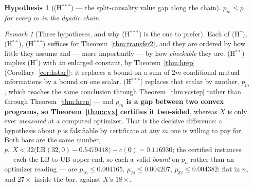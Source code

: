 \documentclass[11pt]{article}
\newtheorem{hypothesis}{Hypothesis}
\theoremstyle{definition}
\theoremstyle{remark}
\newtheorem{remark}{Remark}
\begin{document}
\begin{hypothesis}[(H$^{\ast\ast\ast}$) --- the split-causality value
gap along the chain]
\label{hyp:hstar3}
$p_m\le\bar p$ for every $m$ in the dyadic chain.
\end{hypothesis}

\begin{remark}[Three hypotheses, and why (H$^{\ast\ast\ast}$) is the
one to prefer]
\label{rem:hchain}
Each of (H$^\ast$), (H$^{\ast\ast}$), (H$^{\ast\ast\ast}$) suffices for
Theorem~\ref{thm:transfer2}, and they are ordered by how little they
assume and --- more importantly --- by how \emph{checkable} they are.
(H$^{\ast\ast}$) implies (H$^\ast$) with an enlarged constant, by
Theorem~\ref{thm:hrep} (Corollary~\ref{cor:hstar}); it replaces a bound
on a sum of $2m$ conditional mutual informations by a bound on one
scalar. (H$^{\ast\ast\ast}$) replaces that scalar by another,
$p_m$, which reaches the same conclusion through
Theorem~\ref{thm:scstep} rather than through
Theorem~\ref{thm:hrep} --- and \textbf{$p_m$ is a gap between two
convex programs, so Theorem~\ref{thm:cvx} certifies it two-sided},
whereas $X$ is only ever \emph{measured} at a computed optimizer. That
is the decisive difference: a hypothesis about $p$ is falsifiable by
certificate at any $m$ one is willing to pay for. Both bars are the
same number, $\bar p,\ \bar X<32\bigl(\mathrm{LB}(32,0)-0.5479448
\bigr)-c(0)=0.116930$; the certified instances --- each the
LB-to-UB upper end, so each a valid \emph{bound} on $p_n$ rather
than an optimizer reading --- are $p_{16}\le0.004165$,
$p_{24}\le0.004207$, $p_{32}\le0.004382$: flat in $n$, and
$27\times$ inside the bar, against $X$'s $18\times$.
\end{remark}
\end{document}

